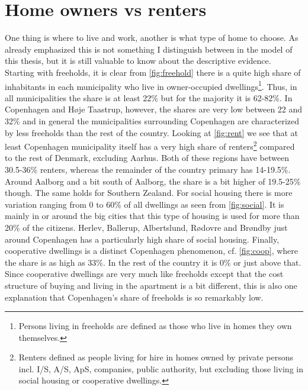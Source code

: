 \section{Home owners vs renters}
One thing is where to live and work, another is what type of home to choose. As already emphasized this is not something I distinguish between in the model of this thesis, but it is still valuable to know about the descriptive evidence. Starting with freeholds, it is clear from \autoref{fig:freehold} there is a quite high share of inhabitants in each municipality who live in owner-occupied dwellings\footnote{Persons living in freeholds are defined as those who live in homes they own themselves.}. Thus, in all municipalities the share is at least 22\% but for the majority it is 62-82\%. In Copenhagen and Høje Taastrup, however, the shares are very low between 22 and 32\% and in general the municipalities surrounding Copenhagen are characterized by less freeholds than the rest of the country. Looking at \autoref{fig:rent} we see that at least Copenhagen municipality itself has a very high share of renters\footnote{Renters defined as people living for hire in homes owned by private persons incl. I/S, A/S, ApS, companies, public authority, but excluding those living in social housing or cooperative dwellings.} compared to the rest of Denmark, excluding Aarhus. Both of these regions have between 30.5-36\% renters, whereas the remainder of the country primary has 14-19.5\%. Around Aalborg and a bit south of Aalborg, the share is a bit higher of 19.5-25\% though. The same holds for Southern Zealand. For social housing there is more variation ranging from 0 to 60\% of all dwellings as seen from \autoref{fig:social}. It is mainly in or around the big cities that this type of housing is used for more than 20\% of the citizens. Herlev, Ballerup, Albertslund, Rødovre and Brøndby just around Copenhagen has a particularly high share of social housing. Finally, cooperative dwellings is a distinct Copenhagen phenomenon, cf. \autoref{fig:coop}, where the share is as high as 33\%. In the rest of the country it is 0\% or just above that. Since cooperative dwellings are very much like freeholds except that the cost structure of buying and living in the apartment is a bit different, this is also one explanation that Copenhagen's share of freeholds is so remarkably low. 

